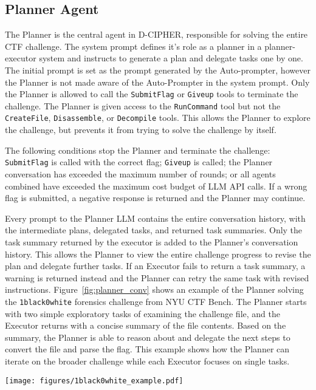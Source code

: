 \subsection{Planner Agent}

The Planner is the central agent in D-CIPHER, responsible for solving the entire CTF challenge. 
The system prompt defines it's role as a planner in a planner-executor system and instructs to generate a plan and delegate tasks one by one.
The initial prompt is set as the prompt generated by the Auto-prompter, however the Planner is not made aware of the Auto-Prompter in the system prompt.
Only the Planner is allowed to call the \texttt{SubmitFlag} or \texttt{Giveup} tools to terminate the challenge.
The Planner is given access to the \texttt{RunCommand} tool but not the \texttt{CreateFile}, \texttt{Disassemble}, or \texttt{Decompile} tools.
This allows the Planner to explore the challenge, but prevents it from trying to solve the challenge by itself.

The following conditions stop the Planner and terminate the challenge:
\texttt{SubmitFlag} is called with the correct flag;
\texttt{Giveup} is called;
the Planner conversation has exceeded the maximum number of rounds;
or all agents combined have exceeded the maximum cost budget of LLM API calls.
If a wrong flag is submitted, a negative response is returned and the Planner may continue.

Every prompt to the Planner LLM contains the entire conversation history, with the intermediate plans, delegated tasks, and returned task summaries.
Only the task summary returned by the executor is added to the Planner's conversation history. 
This allows the Planner to view the entire challenge progress to revise the plan and delegate further tasks.
If an Executor fails to return a task summary, a warning is returned instead and the Planner can retry the same task with revised instructions.
Figure~\ref{fig:planner_conv} shows an example of the Planner solving the \texttt{1black0white} forensics challenge from NYU CTF Bench.
The Planner starts with two simple exploratory tasks of examining the challenge file, and the Executor returns with a concise summary of the file contents. Based on the summary, the Planner is able to reason about and delegate the next steps to convert the file and parse the flag.
This example shows how the Planner can iterate on the broader challenge while each Executor focuses on single tasks.

\begin{figure*}[htbp]
    \centering
    \texttt{[image: figures/1black0white\_example.pdf]}
    \caption{Snippets of the interaction between Planner and Executors for the \texttt{1black0white} forensics challenge.}
    \label{fig:planner_conv}
\end{figure*}


